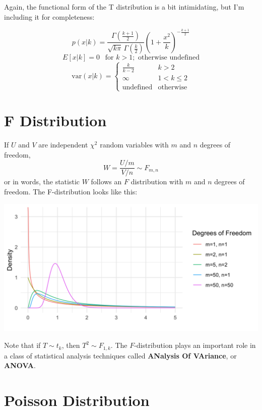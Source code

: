 Again, the functional form of the T distribution is a bit intimidating, but I'm including it for completeness:

$$ p(x|k) = \frac{\Gamma \left(\frac{k+1}{2} \right)} {\sqrt{k\pi}\,\Gamma \left(\frac{k}{2} \right)} \left(1+\frac{x^2}{k} \right)^{-\frac{k+1}{2}} $$
$$ E[x|k] = 0~~\text{ for }k>1; \text{ otherwise undefined} $$
$$ \text{var}(x|k) = \left\{ \begin{array}{cl} \frac{k}{k-2} & k>2 \\
                                               \infty & 1 < k \leq 2 \\
                                               \text{undefined} & \text{otherwise} \end{array} \right. $$

\section{F Distribution}

If $U$ and $V$ are independent $\chi^2$ random variables with $m$ and $n$ degrees of freedom,
$$ W = \frac{U/m}{V/n} \sim F_{m, n} $$
or in words, the statistic $W$ follows an $F$ distribution with $m$ and $n$ degrees of freedom. The F-distribution looks like this:
\begin{center}
\includegraphics[width=\textwidth]{img/hyp-example-f-distribution.png}
\end{center}

Note that if $T \sim t_k$, then $T^2 \sim F_{1,k}$. The $F$-distribution plays an important role in a class of statistical analysis techniques called \textbf{ANalysis Of VAriance}, or \textbf{ANOVA}.

\section{Poisson Distribution}

